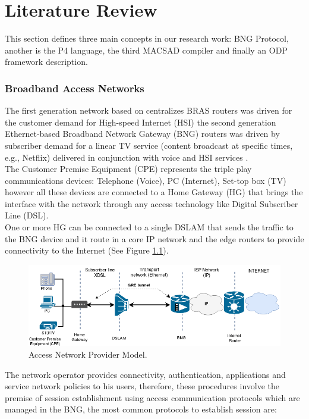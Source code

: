 \chapter{Literature Review}
\label{cap:cap02}
 This section defines three main concepts in our research work: \acrshort{BNG} Protocol, another is the \acrshort{P4} language, the third MACSAD compiler and finally an ODP framework description.

\subsection{Broadband Access Networks}

 The first generation network based on centralizes BRAS routers was driven for the customer demand for High-speed Internet (HSI) the second generation Ethernet-based Broadband Network Gateway (BNG) routers was driven by subscriber demand for a linear TV service (content broadcast at specific times, e.g., Netflix) delivered in conjunction with voice and HSI services \cite{Alcatel}.\\
 The Customer Premise Equipment (CPE) represents the triple play communications devices: Telephone (Voice), PC (Internet), Set-top box (TV) however all these devices are connected to a Home Gateway (HG) that brings the interface with the network through any access technology like Digital Subscriber Line (DSL).\\
 One or more HG can be connected to a single DSLAM that sends the traffic to the BNG device and it route in a core IP network and the edge routers to provide connectivity to the Internet (See Figure \ref{fig:arch}).\\
 \begin{figure}[!h]
 	\centering
 	\includegraphics[width=0.8\linewidth]{figures/bng_architect.png}
 	\caption{Access Network Provider Model.}
 	\label{fig:arch}
\end{figure}
The network operator provides connectivity, authentication, applications and service network  policies to his users, therefore, these procedures involve the premise of session establishment using access communication protocols which are managed in the BNG, the most common protocols to establish session are:

